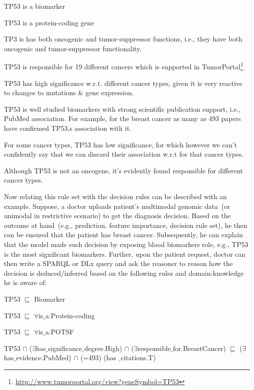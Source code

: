 \begin{itemize}[noitemsep]
\scriptsize{
    \item TP53 is a biomarker
    \item TP53 is a protein-coding gene
    \item TP3 is has both oncogenic and tumor-suppressor functions, i.e., they have both oncogenic and tumor-suppressor functionality. 
    \item TP53 is responsible for 19 different cancers which is supported in TumorPortal\footnote{\url{http://www.tumorportal.org/view?geneSymbol=TP53}}
    \item TP53 has high significance w.r.t. different cancer types, given it is very reactive to changes to mutations \& gene expression. 
    \item TP53 is well studied biomarkers with strong scientific publication support, i.e., PubMed association. For example, for the breast cancer as many as 493 papers have confirmed TP53,s association with it.  
    \item For some cancer types, TP53 has low significance, for which however we can't confidently say that we can discard their association w.r.t for that cancer types. 
    \item Although TP53 is not an oncogene, it's evidently found  responsible for different cancer types. }
\end{itemize}

\hspace*{3.5mm} Now relating this rule set with the decision rules can be described with an example. Suppose, a doctor uploads patient's multimodal genomic data~(or unimodal in restrictive scenario) to get the diagnosis decision. Based on the outcome at hand~(e.g., prediction, feature importance, decision rule set), he then can be ensured that the patient has breast cancer. Subsequently, he can explain that the model made such decision by exposing blood biomarkers role, e.g., TP53 is the most significant biomarkers. Further, upon the patient request, doctor can then write a SPARQL or DLx query and ask the reasoner to reason how the decision is deduced/inferred based on the following rules and domain-knowledge he is aware of:  

\begin{itemize}[noitemsep]
\scriptsize{
    \item TP53 $ \sqsubseteq  $ Biomarker
    \item TP53 $ \sqsubseteq  $ $  \forall $is$ {\_}$a.Protein-coding
    \item TP53 $ \sqsubseteq  $ $  \forall $is$ {\_}$a.POTSF
    \item TP53 $  \cap $ ($\exists$has$ {\_}$significance$ {\_}$degree.High) $  \cap $ ($\exists$responsible$ {\_}$for.BreastCancer) $ \sqsubseteq  $ ($\exists$has$ {\_}$evidence.PubMed) $\cap$ (=493) (has ${\_}$citations.T)}
\end{itemize}

